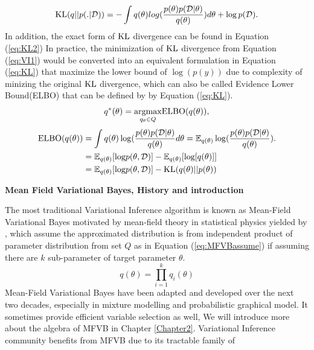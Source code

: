 \begin{equation}
	\label{eq:KL2}
	\textnormal{KL}(q||p(.|\mathcal{D})) = - \int q(\theta)log(\frac{p(\theta)p(\mathcal{D}|\theta)}{q(\theta)}) d\theta + \log p(\mathcal{D}).
\end{equation}
In addition, the exact form of $\textnormal{KL}$ divergence can be found in Equation (\ref{eq:KL2})
In practice, the minimization of $\textnormal{KL}$ divergence from Equation (\ref{eq:VI1}) would be converted into an equivalent formulation in Equation (\ref{eq:KL}) that maximize the lower bound of $\log(p(y))$ due to complexity of minizing the original $\textnormal{KL}$ divergence, which can also be called Evidence Lower Bound(ELBO) that can be defined by by Equation (\ref{eq:KL}).
\begin{equation}
	\label{eq:KL}
	q^*(\theta) = \underset{q_{\theta} \in Q}{\operatorname{ argmax}} \textnormal{ELBO}(q(\theta)),
\end{equation}
\begin{equation}
	\label{eq:ELBO}	
	\begin{aligned}
	\textnormal{ELBO}(q(\theta)) &= \int q(\theta)\log(\frac{p(\theta)p(\mathcal{D}|\theta)}{q(\theta)}d\theta = \mathop{\mathbb{E}_{q(\theta)}}\log(\frac{p(\theta)p(\mathcal{D}|\theta)}{q(\theta)}).\\
	& = \mathop{\mathbb{E}_{q(\theta)}}[\textnormal{log}p(\theta,\mathcal{D})]
	- \mathop{\mathbb{E}_{q(\theta)}}[\textnormal{log}[q(\theta)]]\\
	&= \mathop{\mathbb{E}_{q(\theta)}}[\textnormal{log}p(\theta,\mathcal{D})]
	- \textnormal{KL}(q(\theta)||p(\theta))\\
	\end{aligned}
\end{equation}

\textbf{Mean Field Variational Bayes, History and introduction}

The most traditional Variational Inference algorithm is known as Mean-Field Variational Bayes motivated by mean-field theory in statistical physics yielded by 
\cite{parisi1988statistical}, which assume the approximated distribution is from independent product of parameter distribution from set $Q$ as in Equation (\ref{eq:MFVBassume}) if assuming there are $k$ sub-parameter of target parameter $\theta$.
\begin{equation}
	\label{eq:MFVBassume}
	q(\theta) = \prod_{i=1}^{k} q_i(\theta)
\end{equation}
Mean-Field Variational Bayes have been adapted and developed over the next two decades, especially in mixture modelling and probabilistic graphical model. It sometimes provide efficient variable selection as well, We will introduce more about the algebra of MFVB in Chapter \ref{Chapter2}. Variational Inference community benefits from MFVB due to its tractable family of 

